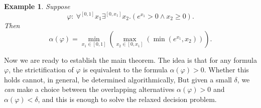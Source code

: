 \documentclass[conference]{IEEEtran}
\newtheorem{example}[theorem]{Example}
\begin{document}
\begin{example}
Suppose  
$$\varphi:\ \forall^{[0,1]} x_1 \exists^{[0,x_1]} x_2. (e^{x_1}>0\wedge x_2\geq 0).$$ Then 
$$\alpha(\varphi) = \min_{x_1\in[0,1]}(\max_{x_2\in[0,x_1]}(\min(e^{x_1}, x_2))).$$ 
\end{example}

Now we are ready to establish the main theorem. The idea is that for any formula $\varphi$, the strictification of $\varphi$ is equivalent to the formula $\alpha(\varphi) > 0$. Whether this holds cannot, in general, be determined algorithmically, But given a small $\delta$, we {\em can} make a choice between the overlapping alternatives $\alpha(\varphi) > 0$ and $\alpha(\varphi) < \delta$, and this is enough to solve the relaxed decision problem.\\
\end{document}
